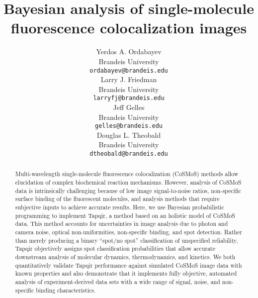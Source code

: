 \documentclass{article}
\title{Bayesian analysis of single-molecule fluorescence colocalization images}
\author{
 Yerdos A. Ordabayev \\
  Brandeis University\\
  \texttt{ordabayev@brandeis.edu} \\
   \And
 Larry  J. Friedman \\
  Brandeis University\\
  \texttt{larryfj@brandeis.edu} \\
  \And
 Jeff Gelles \\
  Brandeis University\\
  \texttt{gelles@brandeis.edu} \\
  \And
 Douglas L. Theobald \\
  Brandeis University\\
  \texttt{dtheobald@brandeis.edu} \\
}
\begin{document}
\maketitle
\begin{abstract} %
Multi-wavelength single-molecule fluorescence colocalization (CoSMoS) methods allow elucidation of complex biochemical reaction mechanisms. However, analysis of CoSMoS data is intrinsically challenging because of low image signal-to-noise ratios, non-specific surface binding of the fluorescent molecules, and analysis methods that require subjective inputs to achieve accurate results. Here, we use Bayesian probabilistic programming to implement Tapqir, a method based on an holistic model of CoSMoS data.  This method accounts for uncertainties in image analysis due to photon and camera noise, optical non-uniformities, non-specific binding, and spot detection. Rather than merely producing a binary ``spot/no spot'' classification of unspecified reliability, Tapqir objectively assigns spot classification probabilities that allow accurate downstream analysis of molecular dynamics, thermodynamics, and kinetics.   We both quantitatively validate Tapqir performance against simulated CoSMoS image data with known properties and also demonstrate that it implements fully objective, automated analysis of experiment-derived data sets with a wide range of signal, noise, and non-specific binding characteristics. 
\end{abstract}


















\end{document}
